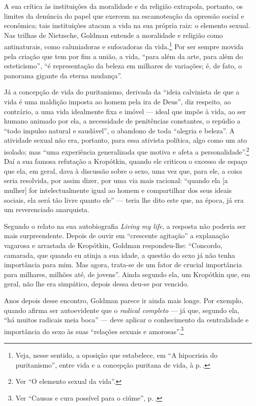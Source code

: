 A sua crítica às instituições da moralidade e da religião extrapola,
portanto, os limites da denúncia do papel que exercem na escamoteação da
opressão social e econômica; tais instituições atacam a vida na sua
própria raiz: o elemento sexual. Nas trilhas de Nietzsche, Goldman
entende a moralidade e religião como antinaturais, como
caluniadoras e sufocadoras da vida.\footnote{Veja, nesse sentido, a oposição que
estabelece, em ``A hipocrisia do puritanismo'', entre vida e a concepção
puritana de vida, à p.\,\pageref{hipocrisia}.} Por ser sempre movida pela criação que tem por fim a
união, a vida, ``para além da arte, para além do esteticismo'',
``é representação da beleza em milhares de variações; é, de fato, o
panorama gigante da eterna mudança''.

Já a concepção de vida do
puritanismo, derivada da ``ideia calvinista de que a vida é uma maldição
imposta ao homem pela ira de Deus'', diz respeito, ao contrário, a uma
vida idealmente fixa e imóvel --- ideal que impõe à vida, ao
ser humano animado por ela, a necessidade de penitências constantes, o
repúdio a ``todo impulso natural e saudável'', o abandono de toda
``alegria e beleza''. A atividade sexual não era, portanto, para
essa ativista política, algo como um ato isolado; mas ``uma
experiência generalizada que motiva e afeta a personalidade''.\footnote{Ver ``O
elemento sexual da vida''.} Daí a sua famosa refutação a Kropótkin,
quando ele criticou o excesso de espaço que ela, em geral, dava à
discussão sobre o sexo, uma vez que, para ele, a coisa seria resolvida,
por assim dizer, por uma via mais racional: ``quando ela {[}a mulher{]}
for intelectualmente igual ao homem e compartilhar dos seus ideais
sociais, ela será tão livre quanto ele'' --- teria lhe dito este que, na
época, já era um reverenciado anarquista.

Segundo o relato na sua
autobiografia \textit{Living my life}, a resposta não poderia ser mais
surpreendente. Depois de ouvir em ``crescente agitação'' a explanação
vagarosa e arrastada de Kropótkin, Goldman respondeu-lhe: ``Concordo,
camarada, que quando eu atinja a sua idade, a questão do sexo já não
tenha importância para mim. Mas agora, trata-se de um fator de
crucial importância para milhares, milhões até, de jovens''. Ainda
segundo ela, um Kropótkin que, em geral, não lhe era simpático, depois
dessa deu-se por vencido.

Anos depois desse encontro, Goldman parece
ir ainda mais longe. Por exemplo, quando afirma
ser autoevidente que o \textit{radical completo} ---
já que, segundo ela, ``há muitos radicais meia boca'' --- deve aplicar o
conhecimento da centralidade e importância do sexo às suas ``relações
sexuais e amorosas''.\footnote{Ver ``Causas e cura
possível para o ciúme'', p.\,\pageref{radical}.}

